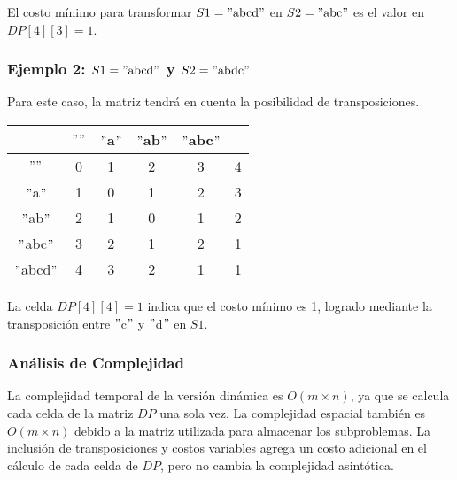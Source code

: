 El costo mínimo para transformar \( S1 = \text{$"$abcd$"$} \) en \( S2 = \text{$"$abc$"$} \) es el valor en \( DP[4][3] = 1 \).

\subsubsection{Ejemplo 2: \( S1 = \text{$"$abcd$"$} \) y \( S2 = \text{$"$abdc$"$} \)}

Para este caso, la matriz tendrá en cuenta la posibilidad de transposiciones.

\begin{table}[h!]
    \centering
    \begin{tabular}{c|c|c|c|c|c}
        & $""$ & $"$a$"$ & $"$ab$"$ & $"$abc$"$ \\
        \hline
        $""$ & 0 & 1 & 2 & 3 & 4 \\
        $"$a$"$ & 1 & 0 & 1 & 2 & 3 \\
        $"$ab$"$ & 2 & 1 & 0 & 1 & 2 \\
        $"$abc$"$ & 3 & 2 & 1 & 2 & 1 \\
        $"$abcd$"$ & 4 & 3 & 2 & 1 & 1 \\
    \end{tabular}
\end{table}

La celda \( DP[4][4] = 1 \) indica que el costo mínimo es 1, logrado mediante la transposición entre $"$c$"$ y $"$d$"$ en \( S1 \).

\subsubsection{Análisis de Complejidad}
La complejidad temporal de la versión dinámica es \( O(m \times n) \), ya que se calcula cada celda de la matriz \( DP \) una sola vez. La complejidad espacial también es \( O(m \times n) \) debido a la matriz utilizada para almacenar los subproblemas. La inclusión de transposiciones y costos variables agrega un costo adicional en el cálculo de cada celda de \( DP \), pero no cambia la complejidad asintótica.
